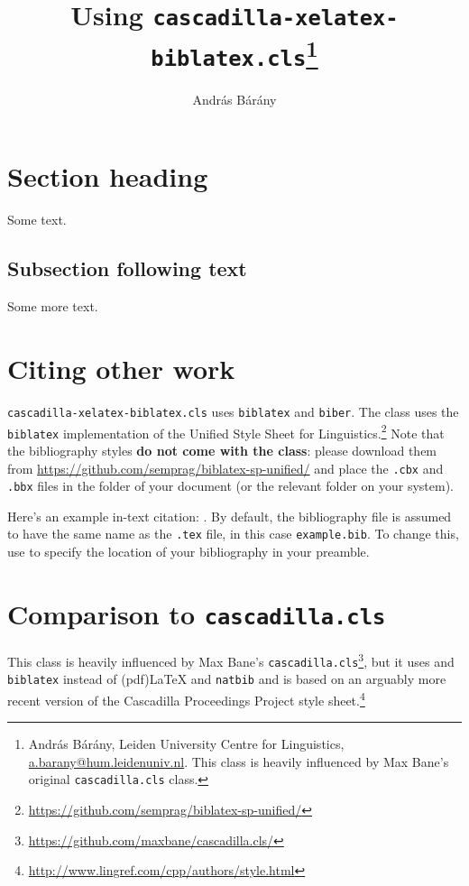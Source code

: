 \documentclass[expex]{cascadilla-xelatex-biblatex}
\title{Using \texttt{cascadilla-xelatex-biblatex.cls}\thanks{András Bárány, Leiden University Centre for Linguistics,
\url{a.barany@hum.leidenuniv.nl}. This class is heavily influenced by Max
Bane's original \texttt{cascadilla.cls} class.}}
\author{András Bárány}
\begin{document}
\maketitle

\section{Section heading}


Some text.

\subsection{Subsection following text}


Some more text.

\section{Citing other work}

\texttt{cascadilla-xelatex-biblatex.cls} uses \texttt{biblatex} and
\texttt{biber}. The class uses the \texttt{biblatex} implementation of the
Unified Style Sheet for
Linguistics.\footnote{\url{https://github.com/semprag/biblatex-sp-unified/}}
Note that the bibliography styles \textbf{do not come with the class}:
please download them from \url{https://github.com/semprag/biblatex-sp-unified/}
and place the \texttt{.cbx} and \texttt{.bbx} files in the folder of your
document (or the relevant folder on your system).

Here's an example in-text citation: \textcite{EKiss2008}. By default, the
bibliography file is assumed to have the same name as the \texttt{.tex} file,
in this case \texttt{example.bib}. To change this, use
\verb++ to specify the location of your bibliography in
your preamble.

\section{Comparison to \texttt{cascadilla.cls}}

This class is heavily influenced by Max Bane's
\texttt{cascadilla.cls}\footnote{\url{https://github.com/maxbane/cascadilla.cls/}},
but it uses \XeLaTeX{} and \texttt{biblatex} instead of (pdf)\LaTeX{} and
\texttt{natbib} and is based on an arguably more recent version of the
Cascadilla Proceedings Project style
sheet.\footnote{\url{http://www.lingref.com/cpp/authors/style.html}}
\end{document}
